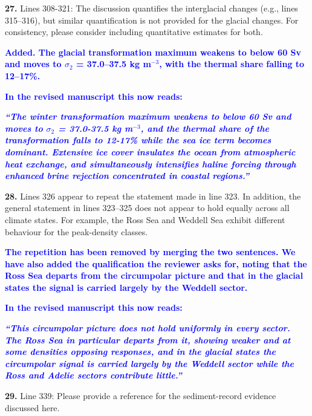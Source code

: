 \documentclass[pdflatex,sn-nature]{sn-jnl}
\begin{document}
\medskip
\noindent \textbf{27.} Lines 308-321: The discussion quantifies the interglacial changes (e.g., lines 315--316), but similar quantification is not provided for the glacial changes. For consistency, please consider including quantitative estimates for both.
\medskip

\noindent\textcolor{blue}{\textbf{Added. The glacial transformation maximum weakens to below 60 Sv and moves to $\sigma$$_2$ = 37.0--37.5 kg m$^{-3}$, with the thermal share falling to 12--17\%.}}



\noindent\textcolor{blue}{\textbf{In the revised manuscript this now reads:}}


\medskip
\noindent\textcolor{blue}{\textbf{\textit{``The winter transformation maximum weakens to below 60 Sv and moves to $\sigma$$_2$ = 37.0-37.5 kg m$^{-3}$, and the thermal share of the transformation falls to 12-17\% while the sea ice term becomes dominant. Extensive ice cover insulates the ocean from atmospheric heat exchange, and simultaneously intensifies haline forcing through enhanced brine rejection concentrated in coastal regions.''}}}
\medskip

\medskip
\noindent \textbf{28.} Lines 326 appear to repeat the statement made in line 323. In addition, the general statement in lines 323--325 does not appear to hold equally across all climate states. For example, the Ross Sea and Weddell Sea exhibit different behaviour for the peak-density classes.
\medskip

\noindent\textcolor{blue}{\textbf{The repetition has been removed by merging the two sentences. We have also added the qualification the reviewer asks for, noting that the Ross Sea departs from the circumpolar picture and that in the glacial states the signal is carried largely by the Weddell sector.}}


\noindent\textcolor{blue}{\textbf{In the revised manuscript this now reads:}}


\medskip
\noindent\textcolor{blue}{\textbf{\textit{``This circumpolar picture does not hold uniformly in every sector. The Ross Sea in particular departs from it, showing weaker and at some densities opposing responses, and in the glacial states the circumpolar signal is carried largely by the Weddell sector while the Ross and Adelie sectors contribute little.''}}}
\medskip

\medskip
\noindent \textbf{29.} Line 339: Please provide a reference for the sediment-record evidence discussed here.
\medskip
\end{document}
